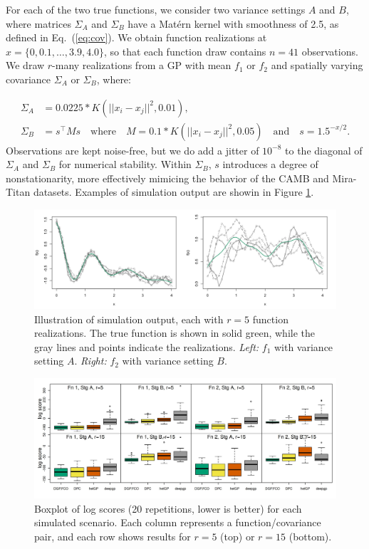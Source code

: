 \documentclass[11pt]{article}
\begin{document}
For each of the two true functions, we consider two variance settings $A$ and $B$, where 
matrices $\Sigma_A$ and $\Sigma_B$ have a Mat\'ern kernel with smoothness of 2.5,
as defined in Eq.~(\ref{eq:cov}). 
We obtain function realizations at $x=\{0, 0.1, \dots, 
3.9, 4.0\}$, so that each function draw contains $n=41$ observations. We draw $r$-many 
realizations from a GP with mean $f_1$ or $f_2$ and spatially varying covariance
$\Sigma_A$ or $\Sigma_B$, where:  

\[
\begin{aligned}
\Sigma_A &= 0.0225 * K(||x_i - x_j||^2, 0.01), \\
\Sigma_B &= s^\top Ms \quad\textrm{where}\quad M = 0.1 * K(||x_i - x_j||^2, 0.05)
\quad\textrm{and}\quad s = 1.5^{-x/2}.
\end{aligned}
\]
Observations are kept noise-free, but we do add a jitter of $10^{-8}$ to the diagonal of $\Sigma_A$ 
and $\Sigma_B$ for numerical stability.  Within $\Sigma_B$, $s$ introduces a degree of
nonstationarity, more effectively mimicing the behavior of the 
CAMB and Mira-Titan datasets.  Examples of simulation output are showin in 
Figure \ref{fig:run_sim_f1A_f2B}.

\begin{figure}
    \centering
    \includegraphics[width=\textwidth]{run_sim_f1A_f2B.png}
    \caption{Illustration of simulation output, each with $r=5$ function realizations. The true function
             is shown in solid green, while the gray lines and points indicate the realizations. 
             {\it Left:} $f_1$ with variance setting $A$. 
             {\it Right:} $f_2$ with variance setting $B$.}   
    \label{fig:run_sim_f1A_f2B}
\end{figure}

\begin{figure}[t]
    \centering
    \includegraphics[width=\textwidth]{sims_logS.jpeg}
    \caption{Boxplot of log scores (20 repetitions, lower is better) for each 
             simulated scenario.  Each column represents a function/covariance 
             pair, and each row shows results for $r=5$ (top) or $r=15$ (bottom).}
    \label{fig:sims_logS}
\end{figure}
\end{document}
